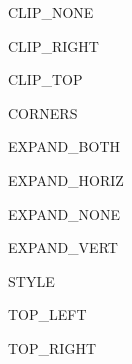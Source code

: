 \begin{datadesc}{CLIP_NONE}
\end{datadesc}
\begin{datadesc}{CLIP_RIGHT}
\end{datadesc}
\begin{datadesc}{CLIP_TOP}
\end{datadesc}
\begin{datadesc}{CORNERS}
\end{datadesc}
\begin{datadesc}{EXPAND_BOTH}
\end{datadesc}
\begin{datadesc}{EXPAND_HORIZ}
\end{datadesc}
\begin{datadesc}{EXPAND_NONE}
\end{datadesc}
\begin{datadesc}{EXPAND_VERT}
\end{datadesc}
\begin{datadesc}{STYLE}
\end{datadesc}
\begin{datadesc}{TOP_LEFT}
\end{datadesc}
\begin{datadesc}{TOP_RIGHT}
\end{datadesc}
